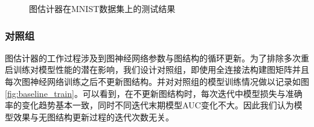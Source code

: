 \begin{figure}[ht]
\centering
{}
\caption{图估计器在MNIST数据集上的测试结果}
\label{fig:mnist}
\end{figure}


\subsubsection{对照组}

图估计器的工作过程涉及到图神经网络参数与图结构的循环更新。为了排除多次重启训练对模型性能的潜在影响，我们设计对照组，即使用全连接法构建图矩阵并且每次图神经网络训练之后不更新图结构。并对对照组的模型训练情况做以记录如图\ref{fig:baseline_train}。可以看到，在不更新图结构时，每次迭代中模型损失与准确率的变化趋势基本一致，同时不同迭代末期模型AUC变化不大。因此我们认为模型效果与无图结构更新过程的迭代次数无关。


